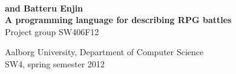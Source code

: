 \thispagestyle{empty}
{\begingroup
\raggedleft
\vspace*{\baselineskip}
{\color{nicered}\HUGE\bfseries \langname{} \\ \Huge and Batteru Enjin}\\[\baselineskip]
{\color{nicered}\large\bfseries A programming language for describing RPG battles}\\[0.1\textheight]
{\color{nicered}\Large Project group SW406F12}\par
\vfill
{\Large \sffamily Aalborg University, Department of Computer Science\\
\hfill SW4, spring semester 2012}
\vspace*{\baselineskip}
\endgroup}


\begin{comment}
\begin{center}
	\hrulefill\newline
	\\
	\begin{LARGE}	
	\textbf{\langname{} and Batteru Enjin}
	\end{LARGE}
	\\
	\begin{large} 
	\textbf{A declarative language for describing RPG battles.}
	\end{large}\\
	\hrulefill\newline
	\\~\\
	Aalborg University, Fourth semester at Department of Computer Science \\
	SW4, spring semester 2012	\\
	Project group SW406F12\\
\end{center}
\end{comment}
